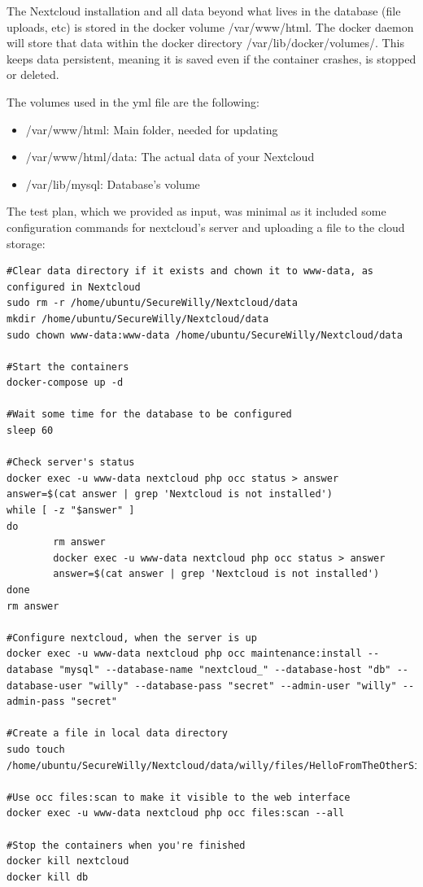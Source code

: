 The Nextcloud installation and all data beyond what lives in the database (file uploads, etc) is stored in the docker volume /var/www/html. The docker daemon will store that data within the docker directory /var/lib/docker/volumes/. This keeps data persistent, meaning it is saved even if the container crashes, is stopped or deleted.

The volumes used in the yml file are the following:
\begin{itemize}
\item /var/www/html: Main folder, needed for updating
\item /var/www/html/data: The actual data of your Nextcloud
\item /var/lib/mysql: Database's volume
\end{itemize}

The test plan, which we provided as input, was minimal as it included some configuration commands for nextcloud's server and uploading a file to the cloud storage:

\begin{lstlisting}[style=bashscript, caption={Test plan used in Nextcloud's project}]
#Clear data directory if it exists and chown it to www-data, as configured in Nextcloud
sudo rm -r /home/ubuntu/SecureWilly/Nextcloud/data
mkdir /home/ubuntu/SecureWilly/Nextcloud/data
sudo chown www-data:www-data /home/ubuntu/SecureWilly/Nextcloud/data

#Start the containers
docker-compose up -d

#Wait some time for the database to be configured
sleep 60

#Check server's status
docker exec -u www-data nextcloud php occ status > answer
answer=$(cat answer | grep 'Nextcloud is not installed')
while [ -z "$answer" ]
do
        rm answer
        docker exec -u www-data nextcloud php occ status > answer
        answer=$(cat answer | grep 'Nextcloud is not installed')
done
rm answer

#Configure nextcloud, when the server is up
docker exec -u www-data nextcloud php occ maintenance:install --database "mysql" --database-name "nextcloud_" --database-host "db" --database-user "willy" --database-pass "secret" --admin-user "willy" --admin-pass "secret"

#Create a file in local data directory
sudo touch /home/ubuntu/SecureWilly/Nextcloud/data/willy/files/HelloFromTheOtherSide

#Use occ files:scan to make it visible to the web interface
docker exec -u www-data nextcloud php occ files:scan --all

#Stop the containers when you're finished
docker kill nextcloud
docker kill db
\end{lstlisting}

